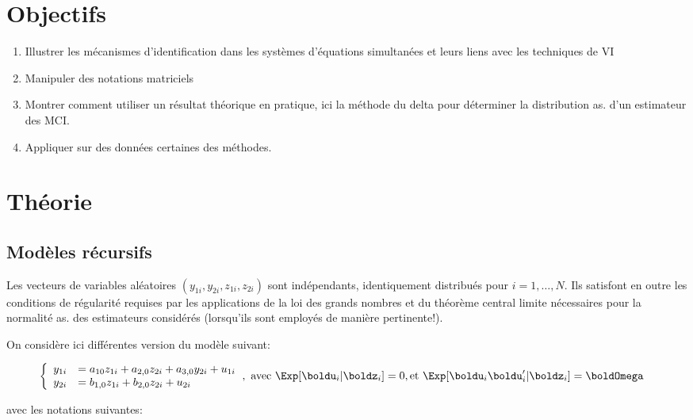 \newpage

\tableofcontents

\newpage

\section{Objectifs}
\begin{enumerate}
\item Illustrer les mécanismes d’identification dans les systèmes d’équations simultanées et leurs liens avec les techniques de VI
\item Manipuler des notations matriciels
\item Montrer comment utiliser un résultat théorique en pratique, ici la méthode du delta pour déterminer la distribution as. 
d’un estimateur des MCI.
\item Appliquer sur des données certaines des méthodes.
\end{enumerate}

\section{Théorie}

\subsection{Modèles récursifs}
Les vecteurs de variables aléatoires $(y_{1i},y_{2i},z_{1i},z_{2i})$ sont indépendants, identiquement distribués pour 
$i= 1,\ldots, N$. Ils satisfont en outre les conditions de régularité requises par les applications de la loi
 des grands nombres et du théorème central limite nécessaires pour la normalité as. des estimateurs considérés 
 (lorsqu’ils sont employés de manière pertinente!). 

 On considère ici différentes version du modèle suivant:

    
 \begin{align}
    \left\{
 \begin{array}{ll}
    y_{1i} &= a_{10}z_{1i} + a_{2,0}z_{2i} + a_{3,0}y_{2i} +u_{1i}\\
    y_{2i}&= b_{1,0}z_{1i} + b_{2,0}z_{2i}+u_{2i}
 \end{array}
\right.
&, \ \text{avec} \  \Exp[\boldu_i|\boldz_i] =0,  \text{et} \ \Exp[\boldu_i\boldu_i^\prime|\boldz_i]=\boldOmega
\label{eq1}
 \end{align}

 avec les notations suivantes:

